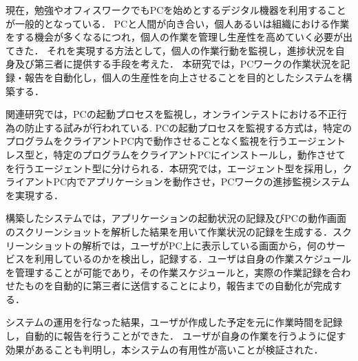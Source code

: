 現在，勉強やオフィスワークでもPCを始めとするデジタル機器を利用することが一般的となっている．
PCと人間が向き合い，個人あるいは組織における作業をする機会が多くなるにつれ，個人の作業を管理し生産性を高めていく必要が出てきた．
それを実現する方法として，個人の作業行動を監視し，進捗状況を自身及び第三者に提供する手段を考えた．
本研究では，PCワークの作業状況を記録・報告を自動化し，個人の生産性を向上させることを目的としたシステムを構築する．

関連研究では，PCの起動プロセスを監視し，オンラインテストにおける不正行為の防止する試みが行われている.
PCの起動プロセスを監視する方式は，特定のプログラムをクライアントPC内で動作させることなく監視を行うエージェントレス型と，特定のプログラムをクライアントPCにインストールし，動作させてを行うエージェント型に分けられる．本研究では，エージェント型を採用し，クライアントPC内でアプリケーションを動作させ，PCワークの進捗監視システムを実現する．

構築したシステムでは，アプリケーションの起動状況の記録及びPCの動作画面のスクリーンショットを解析した結果を用いて作業状況の記録を生成する．スクリーンショットの解析では，ユーザがPC上に表示している画面から，何のサービスを利用しているのかを検出し，記録する．ユーザは自身の作業スケジュールを管理することが可能であり，その作業スケジュールと，実際の作業記録を合わせたものを自動的に第三者に送信することにより，報告までの自動化が完成する．

システムの運用を行なった結果，ユーザが作成した予定を元に作業時間を記録し，自動的に報告を行うことができた．
ユーザが自身の作業を行うように促す効果があることも判明し，本システムの有用性が高いことが検証された．
